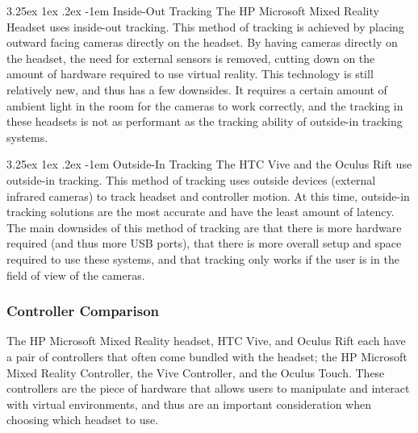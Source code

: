 \documentclass[onecolumn, draftclsnofoot,10pt, compsoc]{IEEEtran}
\makeatletter
\newcounter{subsubsubsection}[subsubsection]
\renewcommand\paragraph{\@startsection{paragraph}{5}{\z@}%
  {3.25ex \@plus1ex \@minus.2ex}%
  {-1em}%
  {\normalfont\normalsize\bfseries}}
\makeatother
\begin{document}

\paragraph{Inside-Out Tracking}
The HP Microsoft Mixed Reality Headset uses inside-out tracking. This method of tracking is achieved by placing outward facing cameras directly on the headset. By having cameras directly on the headset, the need for external sensors is removed, cutting down on the amount of hardware required to use virtual reality. This technology is still relatively new, and thus has a few downsides. It requires a certain amount of ambient light in the room for the cameras to work correctly, and the tracking in these headsets is not as performant as the tracking ability of outside-in tracking systems. 

\paragraph{Outside-In Tracking}
The HTC Vive and the Oculus Rift use outside-in tracking. This method of tracking uses outside devices (external infrared cameras) to track headset and controller motion. At this time, outside-in tracking solutions are the most accurate and have the least amount of latency. The main downsides of this method of tracking are that there is more hardware required (and thus more USB ports), that there is more overall setup and space required to use these systems, and that tracking only works if the user is in the field of view of the cameras.  


\subsubsection{Controller Comparison}
The HP Microsoft Mixed Reality headset, HTC Vive, and Oculus Rift each have a pair of controllers that often come bundled with the headset; the HP Microsoft Mixed Reality Controller, the Vive Controller, and the Oculus Touch. These controllers are the piece of hardware that allows users to manipulate and interact with virtual environments, and thus are an important consideration when choosing which headset to use. 

\end{document}
